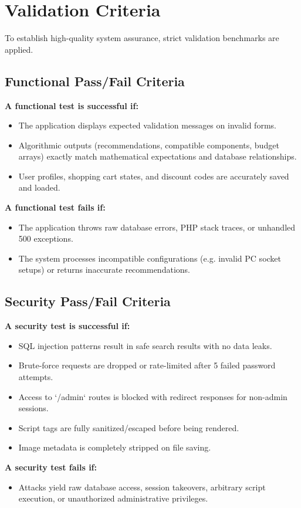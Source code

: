 \documentclass[12pt,a4paper]{article}
\begin{document}
\newpage

\section{Validation Criteria}

To establish high-quality system assurance, strict validation benchmarks are applied.

\subsection{Functional Pass/Fail Criteria}
\textbf{A functional test is successful if:}
\begin{itemize}
\item The application displays expected validation messages on invalid forms.
\item Algorithmic outputs (recommendations, compatible components, budget arrays) exactly match mathematical expectations and database relationships.
\item User profiles, shopping cart states, and discount codes are accurately saved and loaded.
\end{itemize}
\textbf{A functional test fails if:}
\begin{itemize}
\item The application throws raw database errors, PHP stack traces, or unhandled 500 exceptions.
\item The system processes incompatible configurations (e.g. invalid PC socket setups) or returns inaccurate recommendations.
\end{itemize}

\subsection{Security Pass/Fail Criteria}
\textbf{A security test is successful if:}
\begin{itemize}
\item SQL injection patterns result in safe search results with no data leaks.
\item Brute-force requests are dropped or rate-limited after 5 failed password attempts.
\item Access to `/admin` routes is blocked with redirect responses for non-admin sessions.
\item Script tags are fully sanitized/escaped before being rendered.
\item Image metadata is completely stripped on file saving.
\end{itemize}
\textbf{A security test fails if:}
\begin{itemize}
\item Attacks yield raw database access, session takeovers, arbitrary script execution, or unauthorized administrative privileges.
\end{itemize}
\end{document}
